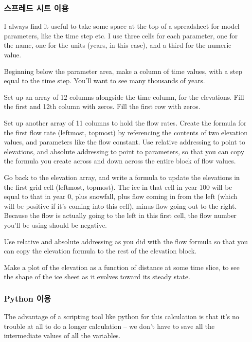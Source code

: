 \subsubsection{스프레드 시트 이용}\index{}

I always find it useful to take some space at the top of a spreadsheet for model parameters, like the time step etc. I use three cells for each parameter, one for the name, one for the units (years, in this case), and a third for the numeric value.

Beginning below the parameter area, make a column of time values, with a step equal to the time step. You'll want to see many thousands of years.

Set up an array of 12 columns alongside the time column, for the elevations. Fill the first and 12th column with zeros. Fill the first row with zeros.

Set up another array of 11 columns to hold the flow rates. Create the formula for the first flow rate (leftmost, topmost) by referencing the contents of two elevation values, and parameters like the flow constant. Use relative addressing to point to elevations, and absolute addressing to point to parameters, so that you can copy the formula you create across and down across the entire block of flow values.

Go back to the elevation array, and write a formula to update the elevations in the first grid cell (leftmost, topmost). The ice in that cell in year 100 will be equal to that in year 0, plus snowfall, plus flow coming in from the left (which will be positive if it's coming into this cell), minus flow going out to the right. Because the flow is actually going to the left in this first cell, the flow number you'll be using should be negative.

Use relative and absolute addressing as you did with the flow formula so that you can copy the elevation formula to the rest of the elevation block.

Make a plot of the elevation as a function of distance at some time slice, to see the shape of the ice sheet as it evolves toward its steady state.


\subsubsection{Python 이용}\index{}

The advantage of a scripting tool like python for this calculation is that it's no trouble at all to do a longer calculation -- we don't have to save all the intermediate values of all the variables.

